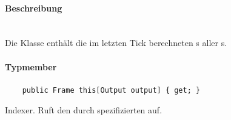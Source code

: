 \paragraph{Beschreibung}~\\
Die Klasse  enthält die im letzten Tick berechneten s aller s.

\paragraph{Typmember}
\begin{itemize}
	
	\begin{verbatim}
	public Frame this[Output output] { get; }
	\end{verbatim}
Indexer. Ruft den durch  spezifizierten  auf.

\end{itemize}




	


